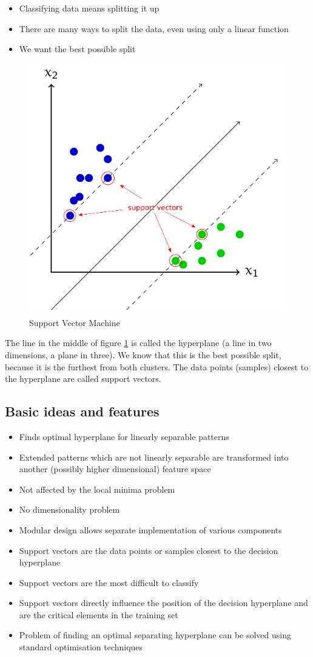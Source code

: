 \documentclass[a4paper, 11pt]{article}
\begin{document}
\begin{itemize}
	\item Classifying data means splitting it up
	\item There are many ways to split the data, even using only a linear function
	\item We want the best possible split
\end{itemize}

\begin{figure}
	\centering
	\includegraphics[keepaspectratio,width=0.4\linewidth]{Pictures/support_vector_machine_ex1}
	\caption{Support Vector Machine}
	\label{fig:supportvectormachineex1}
\end{figure}

The line in the middle of figure \ref{fig:supportvectormachineex1} is called the hyperplane (a line in two dimensions, a plane in three). We know that this is the best possible split, because it is the furthest from both clusters. The data points (samples) closest to the hyperplane are called support vectors.

\subsection{Basic ideas and features}

\begin{itemize}
	\item Finds optimal hyperplane for linearly separable patterns
	\item Extended patterns which are not linearly separable are transformed into another (possibly higher dimensional) feature space
	\item Not affected by the local minima problem
	\item No dimensionality problem
	\item Modular design allows separate implementation of various components
	\item Support vectors are the data points or samples closest to the decision hyperplane
	\item Support vectors are the most difficult to classify
	\item Support vectors directly influence the position of the decision hyperplane and are the critical elements in the training set
	\item Problem of finding an optimal separating hyperplane can be solved using standard optimisation techniques
\end{itemize}
\end{document}
